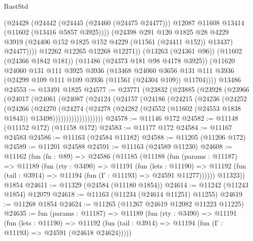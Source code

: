 \begin{lexlean}{RustStd}
\begin{coremodule}
                (@24428
                  (@24442
                    (@24445 (@24460 (@24475 @24477)))
                    @12087
                    @11608
                    @13414
                    (@11602 (@13416 @5857 @3925))))
                (@24398
                  @291
                  @120
                  @1825
                  @28
                  @4229
                  @3919
                  (@24406 @152 @1825 @152 @4229 (@11561 (@24411 @152)) @13437)
                  @24477))))
          @12262
          @12265
          @12268
          @12271))
      (@13263 (@24361 @96))
      (@11602 (@24366 @1842 @181))
      (@11486 (@24373 @181 @98 @4178 @3925))
      (@11620
        @24060
        @131
        @111
        @3925
        @3936
        (@13468
          @24060
          @3656
          @131
          @111
          @3936
          (@24299 @109 @111 @109 @3936 (@11561 (@24304 @109)) @11704))))
    @13486
@24553 := @13491 @1825
@24577 := @23771
    (@23832
      (@23885
        (@23928
          (@23966
            (@24017
              (@24061
                (@24087
                  (@24124
                    (@24157
                      (@24186
                        (@24215
                          (@24236
                            (@24252
                              (@24266
                                (@24270
                                  (@24274
                                    (@24278
                                      (@24282
                                        (@24552
                                          (@11602 (@24553 @1838 @1843))
                                          @13498)))))))))))))))))))
@24578 := @11146 @172
@24582 := @11148 (@11152 @172) (@11158 @172)
@24583 := @11177 @172
@24584 := @11167 @24583
@24586 := @11163 (@24584 @11182)
@24588 := @11205 (@11206 @172)
@24589 := @11201 @24588
@24591 := @11163 (@24589 @11230)
@24608 := @11162
    (fun (fn : @89) =>
    @24586
      (@11185
        (@11188
          (fun (params : @11187) =>
          @11189
            (fun (rty : @3490) =>
            @11191
              (fun (lets : @11190) =>
              @11192 (fun (tail : @3914) => @11194 (fun (Γ : @11193) => @24591 @11277))))))
        @11323))
    @1854
@24611 := @11329 (@24584 (@11180 @1854))
@24614 := @11242 (@11243 @1854) @12079
@24618 := @11163 (@11234 (@24614 @11251) @11255)
@24619 := @11268 @1854
@24624 := @11265 (@11267 @24619 @12082 @11223 @11225)
@24635 := fun (params : @11187) =>
  @11189
    (fun (rty : @3490) =>
    @11191
      (fun (lets : @11190) =>
      @11192 (fun (tail : @3914) => @11194 (fun (Γ : @11193) => @24591 (@24618 @24624)))))

\end{coremodule}
\end{lexlean}
